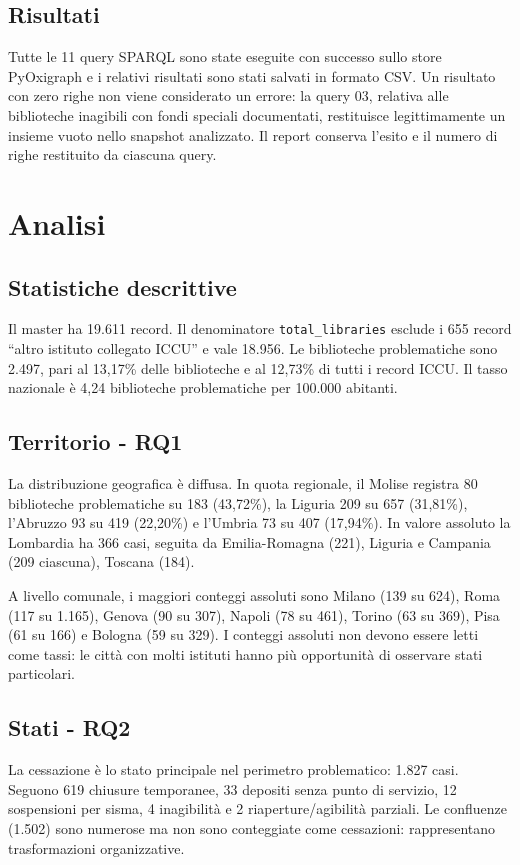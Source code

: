 \documentclass[11pt,a4paper]{article}
\begin{document}
\subsection{Risultati}
Tutte le 11 query SPARQL sono state eseguite con successo sullo store PyOxigraph e i relativi risultati sono stati salvati in formato CSV. Un risultato con zero righe non viene considerato un errore: la query 03, relativa alle biblioteche inagibili con fondi speciali documentati, restituisce legittimamente un insieme vuoto nello snapshot analizzato. Il report  conserva l'esito e il numero di righe restituito da ciascuna query.

\section{Analisi}
\subsection{Statistiche descrittive}
Il master ha 19.611 record. Il denominatore \texttt{total\_libraries} esclude i 655 record ``altro istituto collegato ICCU'' e vale 18.956. Le biblioteche problematiche sono 2.497, pari al 13,17\% delle biblioteche e al 12,73\% di tutti i record ICCU. Il tasso nazionale è 4,24 biblioteche problematiche per 100.000 abitanti.

\subsection{Territorio - RQ1}
La distribuzione geografica è diffusa. In quota regionale, il Molise registra 80 biblioteche problematiche su 183 (43,72\%), la Liguria 209 su 657 (31,81\%), l'Abruzzo 93 su 419 (22,20\%) e l'Umbria 73 su 407 (17,94\%). In valore assoluto la Lombardia ha 366 casi, seguita da Emilia-Romagna (221), Liguria e Campania (209 ciascuna), Toscana (184).

A livello comunale, i maggiori conteggi assoluti sono Milano (139 su 624), Roma (117 su 1.165), Genova (90 su 307), Napoli (78 su 461), Torino (63 su 369), Pisa (61 su 166) e Bologna (59 su 329). I conteggi assoluti non devono essere letti come tassi: le città con molti istituti hanno più opportunità di osservare stati particolari.

\subsection{Stati - RQ2}
La cessazione è lo stato principale nel perimetro problematico: 1.827 casi. Seguono 619 chiusure temporanee, 33 depositi senza punto di servizio, 12 sospensioni per sisma, 4 inagibilità e 2 riaperture/agibilità parziali. Le confluenze (1.502) sono numerose ma non sono conteggiate come cessazioni: rappresentano trasformazioni organizzative.
\end{document}

